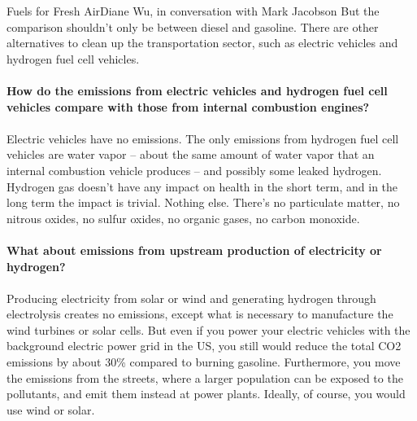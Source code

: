 \documentclass[10pt]{papertex}
\begin{document}
\begin{news}{2}{Fuels for Fresh Air}{Diane Wu, in conversation with Mark Jacobson}{}{}
But the comparison shouldn’t only be between diesel and gasoline. There are 
other alternatives to clean up the transportation sector, such as electric 
vehicles and hydrogen fuel cell vehicles.
\\
\\
\textbf{How do the emissions from electric vehicles and hydrogen fuel cell 
    vehicles compare with those from internal combustion engines?}
\\
\\
Electric vehicles have no emissions. The only emissions from hydrogen fuel 
cell vehicles are water vapor – about the same amount of water vapor that an 
internal combustion vehicle produces – and possibly some leaked hydrogen. 
Hydrogen gas doesn’t have any impact on health in the short term, and in the 
long term the impact is trivial. Nothing else. There’s no particulate matter, 
no nitrous oxides, no sulfur oxides, no organic gases, no carbon monoxide.
\\
\\
\textbf{What about emissions from upstream production of electricity or 
    hydrogen?}
\\
\\
Producing electricity from solar or wind and generating hydrogen through 
electrolysis creates no emissions, except what is necessary to manufacture 
the wind turbines or solar cells. But even if you power your electric vehicles 
with the background electric power grid in the US, you still would reduce the 
total CO2 emissions by about 30\% compared to burning gasoline. Furthermore, 
you move the emissions from the streets, where a larger population can be 
exposed to the pollutants, and emit them instead at power plants. Ideally, of 
course, you would use wind or solar.


\end{news}
\end{document}
